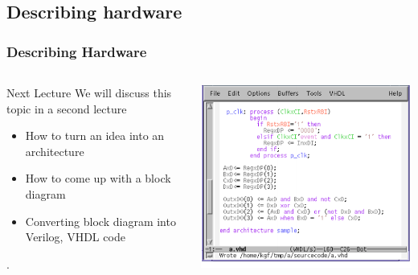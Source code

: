 \documentclass[compress]{beamer}
\begin{document}
\subsection[HDL]{Describing hardware}
\begin{frame}
	\frametitle{Describing Hardware}
	\begin{columns}
		
		\begin{alertblock}{Next Lecture}
			We will discuss this topic
			in a second lecture
			\begin{itemize}
				\item How to turn an idea
				into an architecture
				\item How to come up with
				a block diagram
				\item Converting block
				diagram into Verilog, VHDL code
			\end{itemize}.
		\end{alertblock}
		\begin{center}
			\includegraphics[width= \textwidth]{HDL}
		\end{center}	
	\end{columns}
\end{frame}
\end{document}
